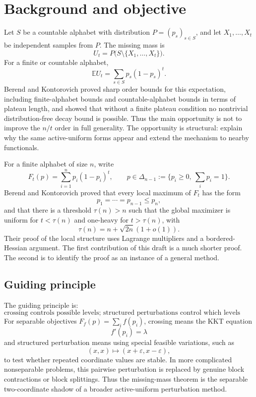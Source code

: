 \documentclass[11pt]{article}
\theoremstyle{definition}
\newcommand{\E}{\mathbb E}
\begin{document}
\tableofcontents

\section{Background and objective}

Let $S$ be a countable alphabet with distribution $P=(p_s)_{s\in S}$, and let $X_1,\ldots,X_t$ be independent samples from $P$. The missing mass is
\[
  U_t=P\bigl(S\setminus \{X_1,\ldots,X_t\}\bigr).
\]
For a finite or countable alphabet,
\[
  \E U_t=\sum_{s\in S}p_s(1-p_s)^t.
\]
Berend and Kontorovich \cite{BK} proved sharp order bounds for this expectation, including finite-alphabet bounds and countable-alphabet bounds in terms of plateau length, and showed that without a finite plateau condition no nontrivial distribution-free decay bound is possible. Thus the main opportunity is not to improve the $n/t$ order in full generality. The opportunity is structural: explain why the same active-uniform forms appear and extend the mechanism to nearby functionals.

For a finite alphabet of size $n$, write
\[
  F_t(p)=\sum_{i=1}^n p_i(1-p_i)^t,
  \qquad p\in\Delta_{n-1}:=\{p_i\ge 0,\ \sum_i p_i=1\}.
\]
Berend and Kontorovich proved that every local maximum of $F_t$ has the form
\[
  p_1=\cdots=p_{n-1}\le p_n,
\]
and that there is a threshold $\tau(n)>n$ such that the global maximizer is uniform for $t<\tau(n)$ and one-heavy for $t>\tau(n)$, with
\[
  \tau(n)=n+\sqrt{2n}(1+o(1)).
\]
Their proof of the local structure uses Lagrange multipliers and a bordered-Hessian argument. The first contribution of this draft is a much shorter proof. The second is to identify the proof as an instance of a general method.

\subsection{Guiding principle}

The guiding principle is:
\[
\boxed{\text{crossing controls possible levels; structured perturbations control which levels may repeat.}}
\]
For separable objectives $F_f(p)=\sum_i f(p_i)$, crossing means the KKT equation
\[
  f'(p_i)=\lambda
\]
and structured perturbation means using special feasible variations, such as
\[
  (x,x)\mapsto (x+\varepsilon,x-\varepsilon),
\]
to test whether repeated coordinate values are stable. In more complicated nonseparable problems, this pairwise perturbation is replaced by genuine block contractions or block splittings. Thus the missing-mass theorem is the separable two-coordinate shadow of a broader active-uniform perturbation method.
\end{document}
